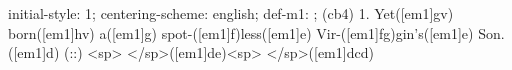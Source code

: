 initial-style: 1;
centering-scheme: english;
def-m1: \grealign;
(cb4) 1. Yet([em1]gv) born([em1]hv) a([em1]g) spot-([em1]f)less([em1]e) Vir-([em1]fg)gin's([em1]e) Son.([em1]d) (::) <sp> </sp>([em1]de)<sp> </sp>([em1]dcd)